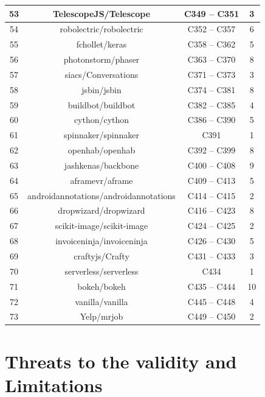 \begin{appendices}
\begin{table}[H]
\begin{tabular}{|c|c|c|c|}
		\hline
		53    & TelescopeJS/Telescope & C349 -- C351 & 3 \bigstrut\\
		\hline
		54    & robolectric/robolectric & C352 -- C357 & 6 \bigstrut\\
		\hline
		55    & fchollet/keras & C358 -- C362 & 5 \bigstrut\\
		\hline
		56    & photonstorm/phaser & C363 -- C370 & 8 \bigstrut\\
		\hline
		57    & siacs/Conversations & C371 -- C373 & 3 \bigstrut\\
		\hline
		58    & jsbin/jsbin & C374 -- C381 & 8 \bigstrut\\
		\hline
		59    & buildbot/buildbot & C382 -- C385 & 4 \bigstrut\\
		\hline
		60    & cython/cython & C386 -- C390 & 5 \bigstrut\\
		\hline
		61    & spinnaker/spinnaker & C391  & 1 \bigstrut\\
		\hline
		62    & openhab/openhab & C392 -- C399 & 8 \bigstrut\\
		\hline
		63    & jashkenas/backbone & C400 -- C408 & 9 \bigstrut\\
		\hline
		64    & aframevr/aframe & C409 -- C413 & 5 \bigstrut\\
		\hline
		65    & androidannotations/androidannotations & C414 -- C415 & 2 \bigstrut\\
		\hline
		66    & dropwizard/dropwizard & C416 -- C423 & 8 \bigstrut\\
		\hline
		67    & scikit-image/scikit-image & C424 -- C425 & 2 \bigstrut\\
		\hline
		68    & invoiceninja/invoiceninja & C426 -- C430 & 5 \bigstrut\\
		\hline
		69    & craftyjs/Crafty & C431 -- C433 & 3 \bigstrut\\
		\hline
		70    & serverless/serverless & C434  & 1 \bigstrut\\
		\hline
		71    & bokeh/bokeh & C435 -- C444 & 10 \bigstrut\\
		\hline
		72    & vanilla/vanilla & C445 -- C448 & 4 \bigstrut\\
		\hline
		73    & Yelp/mrjob & C449 -- C450 & 2 \bigstrut\\
		\hline
	\end{tabular}%
	\label{tab:participants_per_project_part_ii}%
\end{table}%
	


\end{appendices}
\section{Threats to the validity and Limitations}\label{sec_threats_to_the_validity} 

